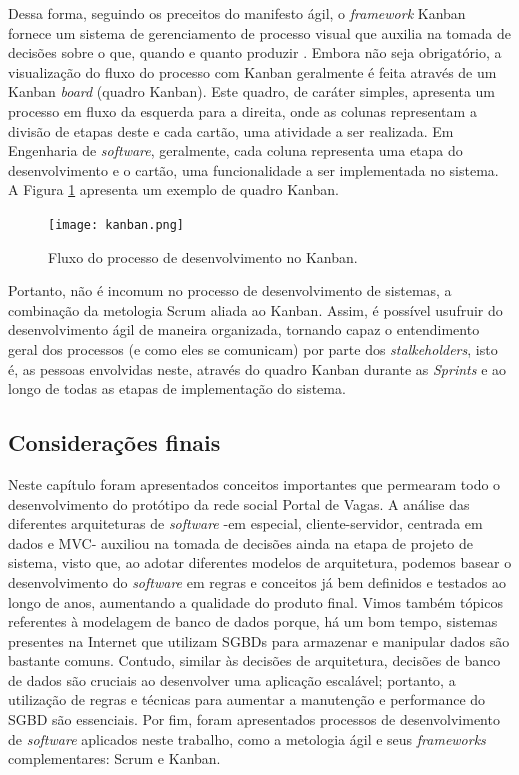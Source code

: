 Dessa forma, seguindo os preceitos do manifesto ágil, o \textit{framework} Kanban fornece um sistema de gerenciamento de processo visual que auxilia na tomada de decisões sobre o que, quando e quanto produzir \cite{kanbanBook2}. Embora não seja obrigatório, a visualização do fluxo do processo com Kanban geralmente é feita através de um Kanban \textit{board} (quadro Kanban). Este quadro, de caráter simples, apresenta um processo em fluxo da esquerda para a direita, onde as colunas representam a divisão de etapas deste e cada cartão, uma atividade a ser realizada. Em Engenharia de \textit{software}, geralmente, cada coluna representa uma etapa do desenvolvimento e o cartão, uma funcionalidade a ser implementada no sistema. A Figura \ref{kanbanFlow} apresenta um exemplo de quadro Kanban.

\begin{figure}[ht]
    \caption{Fluxo do processo de desenvolvimento no Kanban.}
       	\begin{center}
            \texttt{[image: kanban.png]}
        \end{center}
    \label{kanbanFlow}
\end{figure}

Portanto, não é incomum no processo de desenvolvimento de sistemas, a combinação da metologia Scrum aliada ao Kanban. Assim, é possível usufruir do desenvolvimento ágil de maneira organizada, tornando capaz o entendimento geral dos processos (e como eles se comunicam) por parte dos \textit{stalkeholders}, isto é, as pessoas envolvidas neste, através do quadro Kanban durante as \textit{Sprints} e ao longo de todas as etapas de implementação do sistema.

\subsection{Considerações finais}
\label{fundConsideracoes}

Neste capítulo foram apresentados conceitos importantes que permearam todo o desenvolvimento do protótipo da rede social Portal de Vagas. A análise das diferentes arquiteturas de \textit{software} -em especial, cliente-servidor, centrada em dados e MVC- auxiliou na tomada de decisões ainda na etapa de projeto de sistema, visto que, ao adotar diferentes modelos de arquitetura, podemos basear o desenvolvimento do \textit{software} em regras e conceitos já bem definidos e testados ao longo de anos, aumentando a qualidade do produto final. Vimos também tópicos referentes à modelagem de banco de dados porque, há um bom tempo, sistemas presentes na Internet que utilizam SGBDs para armazenar e manipular dados são bastante comuns. Contudo, similar às decisões de arquitetura, decisões de banco de dados são cruciais ao desenvolver uma aplicação escalável; portanto, a utilização de regras e técnicas para aumentar a manutenção e performance do SGBD são essenciais. Por fim, foram apresentados processos de desenvolvimento de \textit{software} aplicados neste trabalho, como a metologia ágil e seus \textit{frameworks} complementares: Scrum e Kanban.